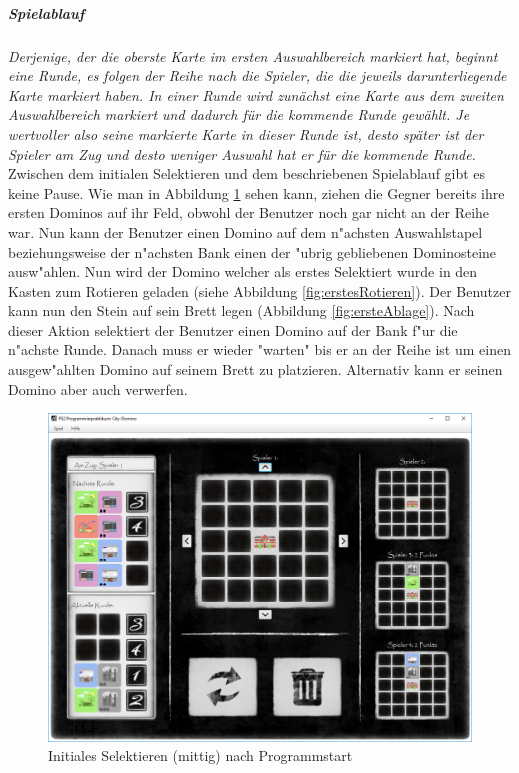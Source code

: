 \subparagraph{Spielablauf}
\emph{Derjenige, der die oberste Karte im ersten Auswahlbereich markiert hat, beginnt eine Runde, es folgen der Reihe
nach die Spieler, die die jeweils darunterliegende Karte markiert haben. In einer Runde wird zunächst eine Karte
aus dem zweiten Auswahlbereich markiert und dadurch für die kommende Runde gewählt. Je wertvoller also seine
markierte Karte in dieser Runde ist, desto später ist der Spieler am Zug und desto weniger Auswahl hat er für die
kommende Runde.}
\cite{aufgabenstellung}
Zwischen dem initialen Selektieren und dem beschriebenen Spielablauf gibt es keine Pause. Wie man in Abbildung \ref{fig:initialesSelektierenMittig} sehen kann, ziehen die Gegner bereits ihre ersten Dominos auf ihr Feld, obwohl der Benutzer noch gar nicht an der Reihe war. Nun kann der Benutzer einen Domino auf dem n"achsten Auswahlstapel beziehungsweise der n"achsten Bank einen der "ubrig gebliebenen Dominosteine ausw"ahlen. Nun wird der Domino welcher als erstes Selektiert wurde in den Kasten zum Rotieren geladen (siehe Abbildung \ref{fig:erstesRotieren}). Der Benutzer kann nun den Stein auf sein Brett legen (Abbildung \ref{fig:ersteAblage}). Nach dieser Aktion selektiert der Benutzer einen Domino auf der Bank f"ur die n"achste Runde. Danach muss er wieder "warten" bis er an der Reihe ist um einen ausgew"ahlten Domino auf seinem Brett zu platzieren. Alternativ kann er seinen Domino aber auch verwerfen.

\begin{figure}
	\centering
	\includegraphics{screenshots/screenshot_InitialesSelektieren2.png}
	\caption[Initiales Selektieren - mittig]{Initiales Selektieren (mittig) nach Programmstart}
	\label{fig:initialesSelektierenMittig}
\end{figure}

